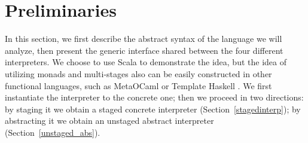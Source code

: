 \newcommand{\TLang}{$L_\lambda$}

\section{Preliminaries}

In this section, we first describe the abstract syntax of the language we will
analyze, then present the generic interface shared between the four different
interpreters. We choose to use Scala to demonstrate the idea, but the idea of
utilizing monads and multi-stages also can be easily constructed in other functional
languages, such as MetaOCaml \cite{DBLP:conf/gpce/CalcagnoTHL03,
  DBLP:conf/flops/Kiselyov14} or Template Haskell \cite{Sheard:2002:TMH:636517.636528}.
We first instantiate the interpreter to the concrete one; then we
proceed in two directions: by staging it we obtain a staged concrete interpreter
(Section~\ref{stagedinterp}); by abstracting it we obtain an unstaged abstract
interpreter (Section~\ref{unstaged_abs}).




